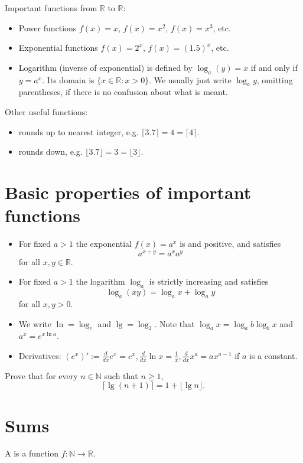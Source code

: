 Important functions from $\mathbb{R}$ to $\mathbb{R}$: 
\begin{itemize}
\item Power functions $f(x) = x$, $f(x) = x^2$, $f(x) = x^3$, etc.
\item Exponential functions $f(x) = 2^x$, $f(x) = (1.5)^x$, etc.
\item Logarithm (inverse of exponential) is defined by $\log_a (y) = x$ if and only if $y = a^x$. 
Its domain is $\{x\in \mathbb{R} : x > 0\}$. We usually just write $\log_a y$, omitting parentheses, if there is no confusion about what is meant.
\end{itemize}

Other useful functions: 
\begin{itemize}
\item {} rounds up to nearest integer, e.g. $\lceil 3.7 \rceil = 4 = \lceil 4 \rceil$.
\item {} rounds down, e.g. $\lfloor 3.7 \rfloor = 3 = \lfloor 3 \rfloor$.
\end{itemize}


\section{Basic properties of important functions}
\begin{itemize}
\item For fixed $a>1$ the exponential $f(x) = a^x$ is  and positive, 
and satisfies $$a^{x+y} = a^x a^y$$ for all $x,y\in \mathbb{R}$. 
\item For fixed $a>1$ the logarithm $\log_a$ is strictly increasing and satisfies 
$$\log_a(xy) = \log_a x + \log_a y$$ for all $x,y>0$.
\item We write $\ln = \log_e$ and $\lg = \log_2$. Note that $\log_a x = \log_a b \log_b x$ and $a^x = e^{x\ln a}$.
\item Derivatives: $(e^x)' := \frac{d}{dx} e^x = e^x, \frac{d}{dx} \ln x = \frac{1}{x},  \frac{d}{dx} x^a = ax^{a-1}$ if $a$ is a constant.
\end{itemize}

\begin{Boxample}[4]
Prove that for every $n\in \mathbb{N}$ such that $n\geq 1$,
$$ \lceil \lg (n+1) \rceil = 1 + \lfloor \lg n \rfloor\text{.}$$
\end{Boxample}


\section{Sums}
A  is a function $f \colon \mathbb{N} \to \mathbb{R}$. 

